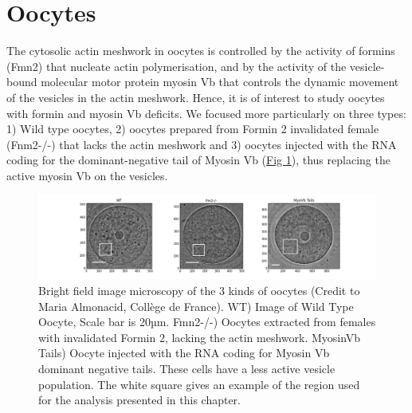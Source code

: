 \documentclass[A4paperpaper,11pt,english]{sphinxmanual}
\begin{document}
\section{Oocytes}
\label{index-latex:oocytes}
The cytosolic actin meshwork in oocytes is controlled by the activity of formins (Fmn2) that
nucleate actin polymerisation, and by the activity of the vesicle-bound molecular motor protein myosin Vb that
controls the dynamic movement of the
vesicles in the actin meshwork. Hence, it is of interest to study oocytes with formin and myosin Vb deficits.
We focused more particularly on three types: 1) Wild type oocytes, 2) oocytes prepared from Formin 2 invalidated female
(Fnm2-/-) that lacks the
actin meshwork and 3) oocytes injected with the RNA coding for the dominant-negative tail of Myosin
Vb (\hyperref[index-latex:fig3oo]{Fig  \ref*{index-latex:fig3oo}}), thus replacing the active myosin Vb on the vesicles.
\begin{figure}[htbp]
\centering
\capstart

\includegraphics[width=1.000\linewidth]{3-oocytes.png}
\caption{Bright field image microscopy of the 3 kinds of oocytes (Credit to Maria
Almonacid, Collège de France). WT) Image of Wild Type Oocyte, Scale bar is
20µm. Fmn2-/-) Oocytes extracted from females with invalidated Formin 2,
lacking the actin meshwork. MyosinVb Tails) Oocyte injected
with the RNA coding for Myosin Vb dominant negative tails. These cells have a less active vesicle
population. The white square gives an example of the region used for the analysis presented in this chapter.}\label{index-latex:fig3oo}\end{figure}
\end{document}
